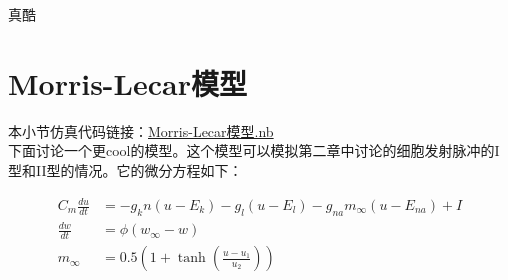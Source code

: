 \documentclass[12pt, a4paper, oneside]{ctexbook}
\begin{document}
真酷~~~~~~~~~~~~~

\section{Morris-Lecar模型}
\textcolor[rgb]{1,0,0}{本小节仿真代码链接：\href{./降维到二维/Morris-Lecar模型.nb}{Morris-Lecar模型.nb}}\\
下面讨论一个更cool的模型。这个模型可以模拟第二章中讨论的细胞发射脉冲的I型和II型的情况。它的微分方程如下：

\begin{equation}
    \begin{aligned}
        C_m\frac{du}{dt}&=-g_k n (u-E_k)-g_l (u-E_l)-g_{na} m_\infty (u-E_{na})+I\\
        \frac{dw}{dt}&=\phi  (w_\infty-w)\\
        m_\infty&=0.5 (1+\tanh(\frac{u-u_1}{u_2}))
    \end{aligned}
\end{equation}
\end{document}
